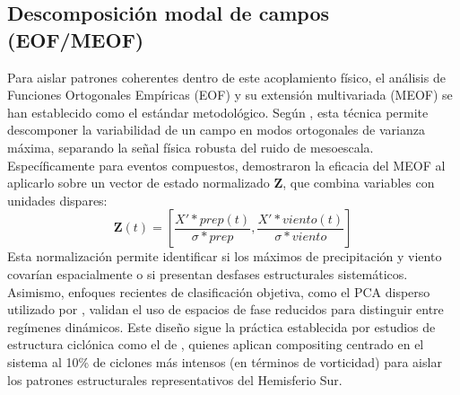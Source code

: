 \subsection{Descomposición modal de campos (EOF/MEOF)}\label{subsec:tb_math_meof}
Para aislar patrones coherentes dentro de este acoplamiento físico, el análisis de Funciones Ortogonales Empíricas (EOF) y su extensión multivariada (MEOF) se han establecido como el estándar metodológico. Según \citet{hannachi2007empirical}, esta técnica permite descomponer la variabilidad de un campo en modos ortogonales de varianza máxima, separando la señal física robusta del ruido de mesoescala. Específicamente para eventos compuestos, \citet{liang2018multivariate} demostraron la eficacia del MEOF al aplicarlo sobre un vector de estado normalizado $\mathbf{Z}$, que combina variables con unidades dispares: 
\begin{equation}
\mathbf{Z}(t) = \left[ \frac{X'*{prep}(t)}{\sigma*{prep}}, \frac{X'*{viento}(t)}{\sigma*{viento}} \right]
\end{equation}
Esta normalización permite identificar si los máximos de precipitación y viento covarían espacialmente o si presentan desfases estructurales sistemáticos. Asimismo, enfoques recientes de clasificación objetiva, como el PCA disperso utilizado por \citet{corner2025classification}, validan el uso de espacios de fase reducidos para distinguir entre regímenes dinámicos. 
Este diseño sigue la práctica establecida por estudios de estructura ciclónica como el de \citet{priestley2022improved}, quienes aplican compositing centrado en el sistema al 10\% de ciclones más intensos (en términos de vorticidad) para aislar los patrones estructurales representativos del Hemisferio Sur.
